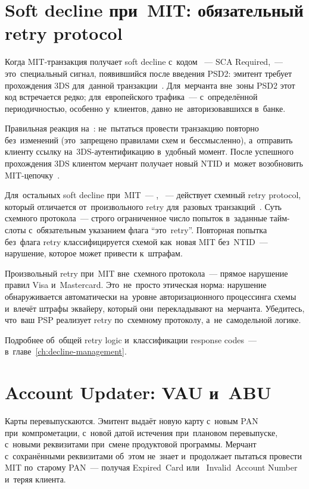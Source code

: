 \section{Soft decline при~MIT: обязательный retry protocol}
\label{sec:subscriptions-soft-decline}

Когда MIT-транзакция получает soft decline с~кодом ~--- SCA
Required,~--- это~специальный сигнал, появившийся после введения PSD2:
эмитент требует прохождения 3DS для~данной транзакции~.
Для~мерчанта вне~зоны PSD2 этот код встречается редко; для~европейского
трафика~--- с~определённой периодичностью, особенно у~клиентов, давно
не~авторизовавшихся в~банке.

Правильная реакция на~: не~пытаться провести транзакцию повторно
без~изменений (это~запрещено правилами схем и~бессмысленно), а~отправить
клиенту ссылку на~3DS-аутентификацию в~удобный момент. После успешного
прохождения 3DS клиентом мерчант получает новый NTID и~может возобновить
MIT-цепочку~.

Для~остальных soft decline при~MIT~--- , ~--- действует
схемный retry protocol, который отличается от~произвольного retry
для~разовых транзакций~. Суть схемного
протокола~--- строго ограниченное число попыток в~заданные тайм-слоты
с~обязательным указанием флага \enquote{это~retry}. Повторная попытка
без~флага retry классифицируется схемой как~новая MIT без~NTID~--- нарушение,
которое может привести к~штрафам.

\begin{important}
  Произвольный retry при~MIT вне~схемного протокола~--- прямое нарушение
  правил Visa и~Mastercard. Это~не~просто этическая норма: нарушение
  обнаруживается автоматически на~уровне авторизационного процессинга
  схемы и~влечёт штрафы эквайеру, который они~перекладывают на~мерчанта.
  Убедитесь, что~ваш PSP реализует retry по~схемному протоколу, а~не~самодельной
  логике.
\end{important}

Подробнее об~общей retry logic и~классификации response codes~---
в~главе~\ref{ch:decline-management}.


\section{Account Updater: VAU и~ABU}
\label{sec:subscriptions-account-updater}

Карты перевыпускаются. Эмитент выдаёт новую карту с~новым PAN при~компрометации,
с~новой датой истечения при~плановом перевыпуске, с~новыми реквизитами
при~смене продуктовой программы. Мерчант с~сохранёнными реквизитами
об~этом не~знает и~продолжает пытаться провести MIT по~старому PAN~---
получая  Expired~Card или~ Invalid~Account Number
и~теряя клиента.

